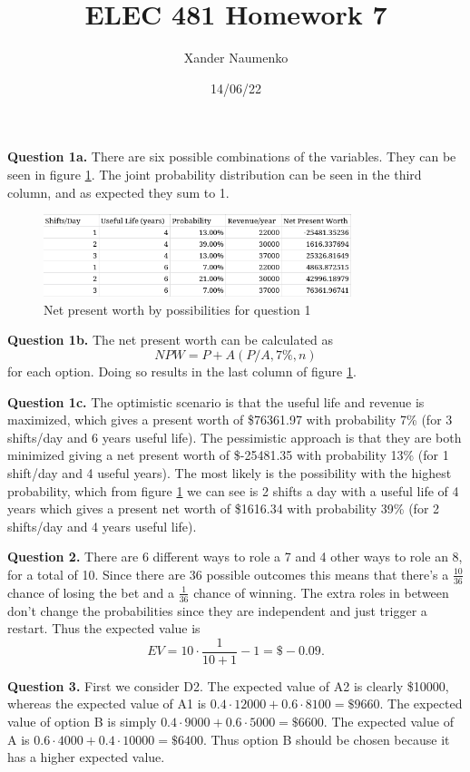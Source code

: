 \documentclass[letterpaper, reqno,11pt]{article}
\begin{document}
\title{ELEC 481 Homework 7}
\date{14/06/22}
\author{Xander Naumenko}
\maketitle

{\noindent\bf Question 1a.} There are six possible combinations of the variables. They can be seen in figure \ref{fig:q1}. The joint probability distribution can be seen in the third column, and as expected they sum to 1. 

\begin{figure}[htpb]
    \centering
    \includegraphics[width=0.8\textwidth]{q1}
    \caption{Net present worth by possibilities for question 1}
    \label{fig:q1}
\end{figure}

{\noindent\bf Question 1b.} The net present worth can be calculated as 
\[
NPW=P+A(P/A, 7\%, n)
\]
for each option. Doing so results in the last column of figure \ref{fig:q1}. 

{\noindent\bf Question 1c.} The optimistic scenario is that the useful life and revenue is maximized, which gives a present worth of \$76361.97 with probability 7\% (for 3 shifts/day and 6 years useful life). The pessimistic approach is that they are both minimized giving a net present worth of \$-25481.35 with probability 13\% (for 1 shift/day and 4 useful years). The most likely is the possibility with the highest probability, which from figure \ref{fig:q1} we can see is 2 shifts a day with a useful life of 4 years which gives a present net worth of \$1616.34 with probability 39\% (for 2 shifts/day and 4 years useful life). 

{\noindent\bf Question 2.} There are 6 different ways to role a 7 and 4 other ways to role an 8, for a total of 10. Since there are 36 possible outcomes this means that there's a $\frac{10}{36}$ chance of losing the bet and a $\frac{1}{36}$ chance of winning. The extra roles in between don't change the probabilities since they are independent and just trigger a restart. Thus the expected value is
\[
EV=10\cdot \frac{1}{10+1}-1=\$-0.09
.\]

{\noindent\bf Question 3.} First we consider D2. The expected value of A2 is clearly \$10000, whereas the expected value of A1 is $0.4\cdot 12000+0.6\cdot 8100=\$9660$. The expected value of option B is simply $0.4\cdot 9000+0.6\cdot 5000=\$6600$. The expected value of A is $0.6\cdot 4000+0.4\cdot 10000=\$6400$. Thus option B should be chosen because it has a higher expected value. 
\end{document}
